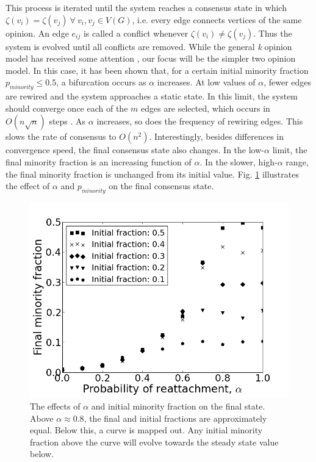 \documentclass[11pt]{article}
\begin{document}
This process is iterated until the system reaches a consensus state in which $\zeta(v_{i}) = \zeta(v_{j}) \ \forall \ v_{i}, v_{j} \in V(G)$, i.e. every edge connects vertices of the same opinion. An edge $e_{ij}$ is called a conflict whenever $\zeta(v_{i}) \ne \zeta(v_{j})$. Thus the system is evolved until all conflicts are removed. While the general \textit{k} opinion model has received some attention \cite{Shi}, our focus will be the simpler two opinion model. In this case, it has been shown that, for a certain initial minority fraction $p_{minority} \le 0.5$, a bifurcation occurs as $\alpha$ increases. At low values of $\alpha$, fewer edges are rewired and the system approaches a static state. In this limit, the system should converge once each of the $m$ edges are selected, which occurs in $O(n\sqrt{n})$ steps  \cite{Durrett2012}. As $\alpha$ increases, so does the frequency of rewiring edges. This slows the rate of consensus to $O(n^{2})$. Interestingly, besides differences in convergence speed, the final consensus state also changes. In the low-$\alpha$ limit, the final minority fraction is an increasing function of $\alpha$. In the slower, high-$\alpha$ range, the final minority fraction is unchanged from its initial value. Fig. \ref{fig:vmBifDiag5000} illustrates the effect of $\alpha$ and $p_{minority}$ on the final consensus state. \vspace{1mm}
\begin{figure}[h!]
  \centering
  \includegraphics[width=.5\linewidth]{vmBifDiag5000}
  \caption{The effects of $\alpha$ and initial minority fraction on the final state. Above $\alpha \approx 0.8$, the final and initial fractions are approximately equal. Below this, a curve is mapped out. Any initial minority fraction above the curve will evolve towards the steady state value below.}
  \label{fig:vmBifDiag5000}
\end{figure}
\end{document}
